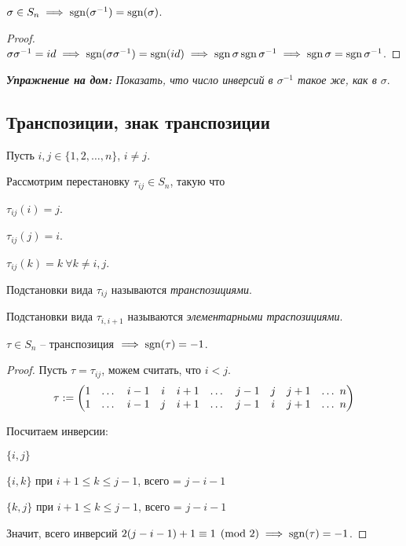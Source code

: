 \begin{corollary}
    $\sigma \in S_n \implies \operatorname{\mathop{\mathrm{sgn}}} (\sigma^{-1}) = \operatorname{\mathop{\mathrm{sgn}}}(\sigma)$.
\end{corollary}

\begin{proof}
    $\sigma \sigma^{-1} = id \implies \operatorname{\mathop{\mathrm{sgn}}}(\sigma \sigma^{-1}) = \operatorname{\mathop{\mathrm{sgn}}}(id) \implies \operatorname{\mathop{\mathrm{sgn}}} \sigma \operatorname{\mathop{\mathrm{sgn}}} \sigma^{-1} \implies \operatorname{\mathop{\mathrm{sgn}}} \sigma = \operatorname{\mathop{\mathrm{sgn}}} \sigma^{-1}$.
\end{proof}

\textit{\textbf{Упражнение на дом:} Показать, что число инверсий в $\sigma^{-1}$ такое же, как в $\sigma$}.

\subsection{Транспозиции, знак транспозиции}

Пусть $i, j \in \{1, 2, \dots, n\}$, $i \neq j$.

Рассмотрим перестановку $\tau_{ij} \in S_n$, такую что

$\tau_{ij}(i) = j$.

$\tau_{ij}(j) = i$.

$\tau_{ij}(k) = k \ \forall k \neq i, j$.

\begin{definition}
    Подстановки вида $\tau_{ij}$ называются \textit{транспозициями}.
\end{definition}

\begin{comment}
    $\tau$ -- траспозиция $\implies \tau^2 = id, \tau^{-1} = \tau$.
\end{comment}

\begin{definition}
    Подстановки вида $\tau_{i, i+1}$ называются \textit{элементарными траспозициями}.
\end{definition}

\begin{lemma}
    $\tau \in S_n$ -- транспозиция $\implies \operatorname{\mathop{\mathrm{sgn}}}(\tau) = -1$.
\end{lemma}

\begin{proof}
    Пусть $\tau = \tau_{ij}$, можем считать, что $i < j$.
    \begin{equation*}
        \tau := \begin{pmatrix}
            1 & \dots & i-1 & i & i + 1 & \dots &
            j - 1 & j & j + 1 & \dots \ n
            \cr
            1 & \dots & i-1 & j & i + 1 & \dots &
            j - 1 & i & j + 1 & \dots \ n
        \end{pmatrix}
    \end{equation*}

    Посчитаем инверсии:

    $\{i, j\}$

    $\{i, k\}$ при $i + 1 \leq k \leq j -1$, всего = $j-i-1$

    $\{k, j\}$ при $i + 1 \leq k \leq j -1$, всего = $j-i-1$

    Значит, всего инверсий $2(j-i-1) + 1 \equiv 1 \pmod{2} \implies \operatorname{\mathop{\mathrm{sgn}}}(\tau) = -1$.
\end{proof}

